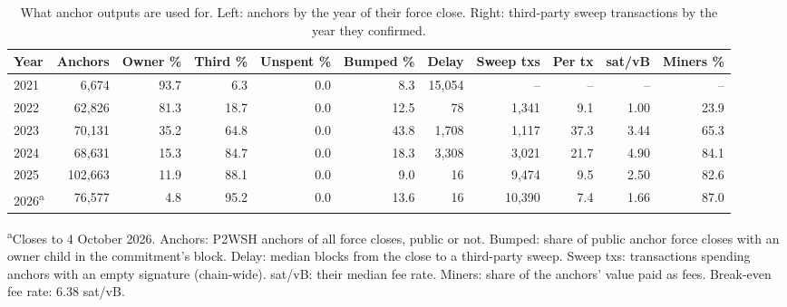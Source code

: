 \begin{table}[t]
\centering
\caption{What anchor outputs are used for. Left: anchors by the year of their force close. Right: third-party sweep transactions by the year they confirmed.}
\label{tab:anchors}
\footnotesize
\begin{tabular}{lrrrrrrrrrr}
\toprule
Year & Anchors & Owner \% & Third \% & Unspent \% & Bumped \% & Delay & Sweep txs & Per tx & sat/vB & Miners \% \\
\midrule
2021 & 6{,}674 & 93.7 & 6.3 & 0.0 & 8.3 & 15{,}054 & -- & -- & -- & -- \\
2022 & 62{,}826 & 81.3 & 18.7 & 0.0 & 12.5 & 78 & 1{,}341 & 9.1 & 1.00 & 23.9 \\
2023 & 70{,}131 & 35.2 & 64.8 & 0.0 & 43.8 & 1{,}708 & 1{,}117 & 37.3 & 3.44 & 65.3 \\
2024 & 68{,}631 & 15.3 & 84.7 & 0.0 & 18.3 & 3{,}308 & 3{,}021 & 21.7 & 4.90 & 84.1 \\
2025 & 102{,}663 & 11.9 & 88.1 & 0.0 & 9.0 & 16 & 9{,}474 & 9.5 & 2.50 & 82.6 \\
2026\textsuperscript{a} & 76{,}577 & 4.8 & 95.2 & 0.0 & 13.6 & 16 & 10{,}390 & 7.4 & 1.66 & 87.0 \\
\bottomrule
\end{tabular}
\par\smallskip\parbox{\linewidth}{\scriptsize \textsuperscript{a}Closes to 4 October 2026. Anchors: P2WSH anchors of all force closes, public or not. Bumped: share of public anchor force closes with an owner child in the commitment's block. Delay: median blocks from the close to a third-party sweep. Sweep txs: transactions spending anchors with an empty signature (chain-wide). sat/vB: their median fee rate. Miners: share of the anchors' value paid as fees. Break-even fee rate: 6.38 sat/vB.}
\end{table}
